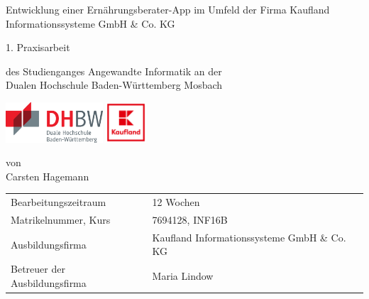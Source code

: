 \def\title{Entwicklung einer Ernährungsberater-App im Umfeld der Firma Kaufland Informationssysteme GmbH \& Co. KG}
\def\author{Carsten Hagemann}

\begin{titlepage}

\vspace{10mm}

\begin{center}
	\vspace{5mm}
	
	\huge \title{}
	
	\vspace{14.2pt}
	
	\large 1. Praxisarbeit
	
	
	\vspace{42.6pt}
	
	
	\vspace{42.6pt}
	
	\small des Studienganges Angewandte Informatik an der \\
	\large Dualen Hochschule Baden-Württemberg Mosbach
    
    \vspace{10.2pt}
    
    \includegraphics[height=1.5cm]{include/images/logo-dhbw.eps}
    \hspace{35pt}
	\includegraphics[height=1.5cm]{include/images/kauflandlogo.png}
	
	\vspace{84.6pt}
	
	\small von \\
	\large \author{}
\end{center}

\vspace{68.6pt}

\begin{table}[h]
    \centering
    \begin{tabular}{ll}
        \small Bearbeitungszeitraum                 & 12 Wochen                     \\
        \small Matrikelnummer, Kurs                 & 7694128, INF16B    \\
        \small Ausbildungsfirma                     & Kaufland Informationssysteme GmbH \& Co. KG \\
        \small Betreuer der Ausbildungsfirma        & Maria Lindow        \\
    \end{tabular}
\end{table}

\vspace{49.7pt}


\end{titlepage}